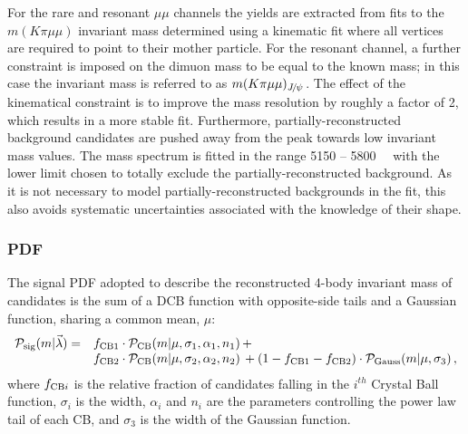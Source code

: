 For the rare and resonant $\mu\mu$ channels the yields are extracted from fits to the $m(K\pi \mu\mu)$ invariant mass 
determined using a kinematic fit where all vertices are required to point to their mother particle.
For the resonant channel, a further constraint is imposed on the dimuon mass to be equal to the known \jpsi mass;
in this case the invariant mass is referred to as $m(K\pi \mu\mu)_\jpsi$.
The effect of the kinematical constraint is to improve the mass resolution by roughly a factor of 2, which results
in a more stable fit. Furthermore, partially-reconstructed  background candidates are pushed away from
the \Bz peak towards low invariant mass values. %
The mass spectrum is fitted in the range 5150 -- 5800~\mevcc~ with the lower limit
chosen to totally exclude the partially-reconstructed  background.
As it is not necessary to model partially-reconstructed  backgrounds in the fit, this also avoids
systematic uncertainties associated with the knowledge of their shape. 

\subsubsection{\BdToKstJPsmm PDF}

The signal PDF adopted to describe the reconstructed 4-body invariant mass of \BdToKstJPsmm candidates is the 
sum of a DCB function with opposite-side tails and a Gaussian function, sharing a common mean, $\mu$:
%
\begin{equation*}
\begin{array}{rl}
\mathcal{P}_{\rm sig}(m | \vec{\lambda}) = & 
f_{\rm CB1} \cdot \mathcal{P}_{\rm CB}(m | \mu, \sigma_1, \alpha_1, n_1) \, + \\
& f_{\rm CB2} \cdot \mathcal{P}_{\rm CB}(m | \mu, \sigma_2, \alpha_2, n_2) \, 
+ (1 - f_{\rm CB1} -f_{\rm CB2}) \cdot \mathcal{P}_{\rm Gauss}(m | \mu, \sigma_3) \, ,
\end{array}
\end{equation*}
where $f_{{\rm CB}i}$ is the relative fraction of candidates falling in the $i^{th}$ Crystal Ball function, $\sigma_i$ 
is the width, $\alpha_i$ and $n_i$ are the parameters controlling the power law tail of each CB, and $\sigma_3$ 
is the width of the Gaussian function.

